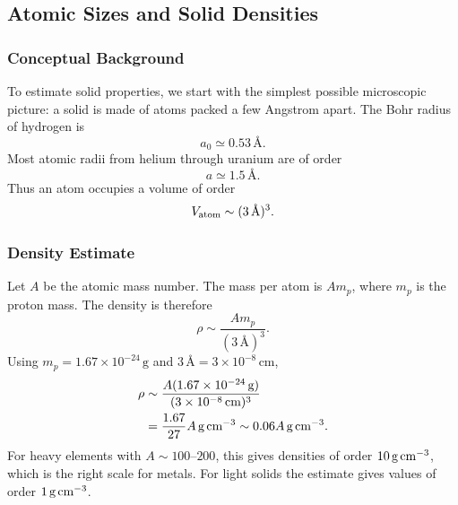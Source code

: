 \subsection{Atomic Sizes and Solid Densities}
\label{sec:lec11:atomic-density}

\subsubsection*{Conceptual Background}
To estimate solid properties, we start with the simplest possible microscopic
picture: a solid is made of atoms packed a few Angstrom apart. The Bohr radius
of hydrogen is
\begin{equation}
    a_0\simeq0.53\,\text{\AA}.
    \label{eq:lec11:bohr}
\end{equation}
Most atomic radii from helium through uranium are of order
\begin{equation}
    a\simeq1.5\,\text{\AA}.
    \label{eq:lec11:atomic-radius}
\end{equation}
Thus an atom occupies a volume of order
\begin{equation}
    V_{\rm atom}\sim (3\,\text{\AA})^3.
    \label{eq:lec11:atomic-volume}
\end{equation}

\subsubsection*{Density Estimate}
Let $A$ be the atomic mass number. The mass per atom is $Am_p$, where $m_p$ is
the proton mass. The density is therefore
\begin{equation}
    \rho\sim \frac{Am_p}{(3\,\text{\AA})^3}.
    \label{eq:lec11:rho-step}
\end{equation}
Using $m_p=1.67\times10^{-24}\,\text{g}$ and
$3\,\text{\AA}=3\times10^{-8}\,\text{cm}$,
\begin{align}
    \rho
    &\sim
    \frac{A(1.67\times10^{-24}\,\text{g})}
         {(3\times10^{-8}\,\text{cm})^3}
    \notag\\
    &=
    \frac{1.67}{27}A\,\text{g\,cm}^{-3}
    \sim 0.06A\,\text{g\,cm}^{-3}.
    \label{eq:lec11:rho-number}
\end{align}
For heavy elements with $A\sim 100$--$200$, this gives densities of order
$10\,\text{g\,cm}^{-3}$, which is the right scale for metals. For light solids
the estimate gives values of order $1\,\text{g\,cm}^{-3}$.

